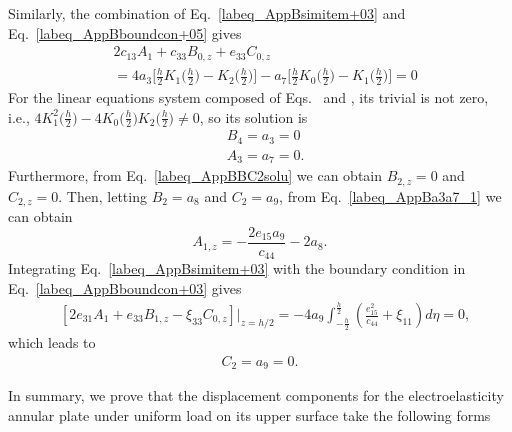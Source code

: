 \documentclass[12pt,sort&compress,fleqn,3p]{elsarticle}
\newcommand{\er}[4]{{#1}_{#2}{#3}_{#4}}
\newcommand{\de}[5]{{#1}_{#2}{#3}_{{#4},{#5}}}
\begin{document}
Similarly, the combination of Eq.~\eqref{labeq_AppBsimitem+03} and Eq.~\eqref{labeq_AppBboundcon+05} gives
\begin{equation}\label{labeq_AppBa3a7_2}
\begin{split}
&2\er{c}{13}{A}{1}+\de{c}{33}{B}{0}{z}+\de{e}{33}{C}{0}{z}\\
&=4a_{3}\bigg[\frac{h}{2}K_{1}\Big(\frac{h}{2}\Big)-K_{2}\Big(\frac{h}{2}\Big)\bigg]-a_{7}\bigg[\frac{h}{2}K_{0}\Big(\frac{h}{2}\Big)-K_{1}\Big(\frac{h}{2}\Big)\bigg]=0
\end{split}
\end{equation}
For the linear equations system   composed of Eqs.~\label{labeq_AppBa3a7_1} and \label{labeq_AppBa3a7_2},  its  trivial is  not zero, i.e.,  $4K_{1}^{2}\Big(\frac{h}{2}\Big)-4K_{0}\Big(\frac{h}{2}\Big)K_{2}\Big(\frac{h}{2}\Big)\neq0$, so its solution is
\begin{equation}\label{labeq_AppBa6=0}
\begin{split}
&B_{4}=a_{3}=0\\
&A_{3}=a_{7}=0.
\end{split}
\end{equation}
Furthermore, from Eq.~\eqref{labeq_AppBBC2solu} we can obtain $B_{2,z}=0$ and $C_{2,z}=0$.   Then, letting $B_2 = a_8$ and   $C_{2}=a_9$, from  Eq.~\eqref{labeq_AppBa3a7_1} we can obtain
\begin{equation}\label{labeq_AppBA1z}
A_{1,z}=-\frac{2e_{15}a_{9}}{c_{44}}-2a_{8}.
\end{equation}
Integrating Eq.~\eqref{labeq_AppBsimitem+03} with the boundary condition in Eq.~\eqref{labeq_AppBboundcon+03}  gives
\begin{equation}\label{labeq_AppBa9eq}
\begin{split}
&[2\er{e}{31}{A}{1}+\de{e}{33}{B}{1}{z}-\de{\xi}{33}{C}{0}{z}]\big|_{z= h/2}=-4a_{9}\int_{-\frac{h}{2}}^{\frac{h}{2}}\left(\frac{e_{15}^{2}}{c_{44}}+\xi_{11}\right)d\eta=0,
\end{split}
\end{equation}
which leads to
\begin{equation}\label{labeq_AppBa9=0}
\begin{split}
C_2 = a_9 = 0.
\end{split}
\end{equation}





In summary,  we prove  that the displacement components for the  electroelasticity annular plate under uniform load on its upper surface take the following forms
\end{document}
